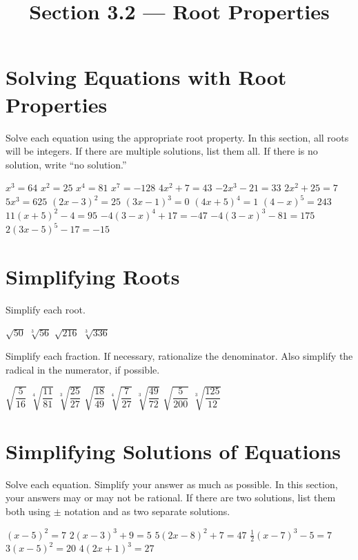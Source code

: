 

\title{Section 3.2 --- Root Properties}


\maketitle
\section*{Solving Equations with Root Properties}
Solve each equation using the appropriate root property. In this section, all roots will be integers. If there are multiple solutions, list them all. If there is no solution, write ``no solution.''
\begin{smenum}
\mitemxxxx
{$x^3=64$}
{$x^2=25$}
{$x^4=81$}
{$x^7=-128$}
\mitemxxxx
{$4x^2+7=43$}
{$-2x^3-21=33$}
{$2x^2+25=7$}
{$5x^3=625$}
\mitemxxxx
{$(2x-3)^2=25$}
{$(3x-1)^3=0$}
{$(4x+5)^4=1$}
{$(4-x)^5=243$}
\mitemxx
{$11(x+5)^2-4=95$}
{$-4(3-x)^4+17=-47$}
\mitemxx
{$-4(3-x)^3-81=175$}
{$2(3x-5)^5-17=-15$}
\end{smenum}
\section*{Simplifying Roots}
Simplify each root.
\begin{smenum}
\mitemxxxx
{$\sqrt{50}$}
{$\sqrt[3]{56}$}
{$\sqrt{216}$}
{$\sqrt[3]{336}$}
\end{smenum}
Simplify each fraction. If necessary, rationalize the denominator. Also simplify the radical in the numerator, if possible.
\begin{smenum}
\mitemxxxx
{$\sqrt{\dfrac{5}{16}}$}
{$\sqrt[4]{\dfrac{11}{81}}$}
{$\sqrt[3]{\dfrac{25}{27}}$}
{$\sqrt{\dfrac{18}{49}}$}
\mitemxxxx
{$\sqrt[4]{\dfrac{7}{27}}$}
{$\sqrt[3]{\dfrac{49}{72}}$}
{$\sqrt{\dfrac{5}{200}}$}
{$\sqrt[3]{\dfrac{125}{12}}$}
\end{smenum}
\section*{Simplifying Solutions of Equations}
Solve each equation. Simplify your answer as much as possible. In this section, your answers may or may not be rational. If there are two solutions, list them both using $\pm$ notation and as two separate solutions.
\begin{smenum}
\mitemxxx
{$(x-5)^2=7$}
{$2(x-3)^3+9=5$}
{$5(2x-8)^2+7=47$}
\mitemxxx
{$\frac{1}{2}(x-7)^3-5=7$}
{$3(x-5)^2=20$}
{$4(2x+1)^3=27$}
\end{smenum}

